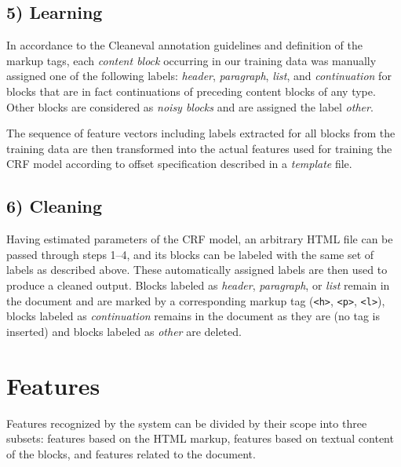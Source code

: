 \documentclass[12pt,a4paper, fleqn, leqno, twoside]{article}
\newcommand{\mysubsection}[1]{\subsection*{\bf #1}}
\begin{document}
\mysubsection{5) Learning}

In accordance to the Cleaneval annotation guidelines and definition of the markup tags, each \textit{content block} occurring in our training data was manually assigned one of the following labels: {\it header}, {\it paragraph}, {\it list}, and {\it continuation} for blocks that are in fact continuations of preceding content blocks of any type. Other blocks are considered as \textit{noisy blocks} and are assigned the label \textit{other}.

The sequence of feature vectors including labels extracted for all blocks from the training data are then transformed into the actual features used for training the CRF model according to offset specification described in a \textit{template} file.

\mysubsection{6) Cleaning}

Having estimated parameters of the CRF model, an arbitrary HTML file can be passed through steps 1--4, and its blocks can be labeled with the same set of labels as described above. These automatically assigned labels are then used to produce a cleaned output. Blocks labeled as {\it header}, {\it paragraph}, or {\it list} remain in the document and are marked by a corresponding markup tag ({\tt <h>}, {\tt <p>}, {\tt <l>}), blocks labeled as {\it continuation} remains in the document as they are (no  tag is inserted) and blocks labeled as {\it other} are deleted.



% 
% 
% 

\section{Features}

Features recognized by the system can be divided by their scope into three subsets:
features based on the HTML markup,  features based on textual content of the blocks, and features related to the document.
\end{document}
